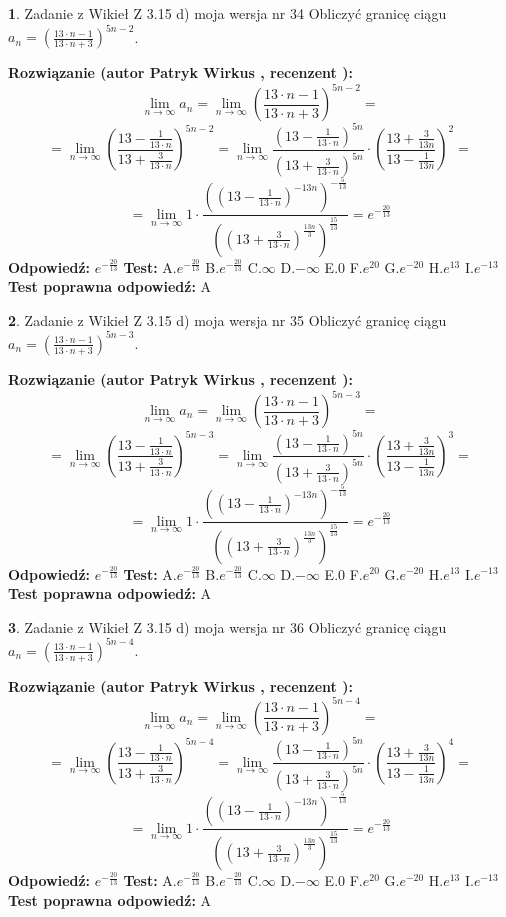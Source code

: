 \documentclass[12pt, a4paper]{article}
\theoremstyle{definition} %
\newtheorem{zad}{}
\newcommand{\zadStart}[1]{\begin{zad}#1\newline}
\newcommand{\zadStop}{\end{zad}}
\newcommand{\rozwStart}[2]{\noindent \textbf{Rozwiązanie (autor #1 , recenzent #2): }\newline}
\newcommand{\rozwStop}{\newline}
\newcommand{\odpStart}{\noindent \textbf{Odpowiedź:}\newline}
\newcommand{\odpStop}{\newline}
\newcommand{\testStart}{\noindent \textbf{Test:}\newline}
\newcommand{\testStop}{\newline}
\newcommand{\kluczStart}{\noindent \textbf{Test poprawna odpowiedź:}\newline}
\newcommand{\kluczStop}{\newline}
\begin{document}
\zadStart{Zadanie z Wikieł Z 3.15 d) moja wersja nr 34}
Obliczyć granicę ciągu $a_{n}=(\frac{13\cdot n - 1}{13 \cdot n + 3})^{5n-2}$.
\zadStop
\rozwStart{Patryk Wirkus}{}
$$\lim\limits_{n\to\infty} a_{n} = \lim\limits_{n\to\infty}(\frac{13\cdot n - 1}{13 \cdot n + 3})^{5n-2}=$$
$$=\lim\limits_{n\to\infty}(\frac{13 - \frac{1}{13\cdot n}}{13 + \frac{3}{13 \cdot n}})^{5n-2}=\lim\limits_{n\to\infty}\frac{(13 - \frac{1}{13\cdot n})^{5n}}{(13 + \frac{3}{13\cdot n})^{5n}} \cdot (\frac{13+\frac{3}{13n}}{13-\frac{1}{13n}})^{2}=$$
$$=\lim\limits_{n\to\infty} 1 \cdot \frac{((13-\frac{1}{13 \cdot n})^{-13n})^{-\frac{5}{13}}}{((13+\frac{3}{13 \cdot n})^{\frac{13n}{3}})^{\frac{15}{13}}} =e^{-\frac{20}{13}}$$
\rozwStop
\odpStart
$e^{-\frac{20}{13}}$
\odpStop
\testStart
A.$ e^{-\frac{20}{13}}$
B.$ e^{-\frac{20}{13}}$
C.$\infty$
D.$-\infty$
E.$0$
F.$e^{20}$
G.$e^{-20}$
H.$e^{13}$
I.$e^{-13}$
\testStop
\kluczStart
A
\kluczStop



\zadStart{Zadanie z Wikieł Z 3.15 d) moja wersja nr 35}
Obliczyć granicę ciągu $a_{n}=(\frac{13\cdot n - 1}{13 \cdot n + 3})^{5n-3}$.
\zadStop
\rozwStart{Patryk Wirkus}{}
$$\lim\limits_{n\to\infty} a_{n} = \lim\limits_{n\to\infty}(\frac{13\cdot n - 1}{13 \cdot n + 3})^{5n-3}=$$
$$=\lim\limits_{n\to\infty}(\frac{13 - \frac{1}{13\cdot n}}{13 + \frac{3}{13 \cdot n}})^{5n-3}=\lim\limits_{n\to\infty}\frac{(13 - \frac{1}{13\cdot n})^{5n}}{(13 + \frac{3}{13\cdot n})^{5n}} \cdot (\frac{13+\frac{3}{13n}}{13-\frac{1}{13n}})^{3}=$$
$$=\lim\limits_{n\to\infty} 1 \cdot \frac{((13-\frac{1}{13 \cdot n})^{-13n})^{-\frac{5}{13}}}{((13+\frac{3}{13 \cdot n})^{\frac{13n}{3}})^{\frac{15}{13}}} =e^{-\frac{20}{13}}$$
\rozwStop
\odpStart
$e^{-\frac{20}{13}}$
\odpStop
\testStart
A.$ e^{-\frac{20}{13}}$
B.$ e^{-\frac{20}{13}}$
C.$\infty$
D.$-\infty$
E.$0$
F.$e^{20}$
G.$e^{-20}$
H.$e^{13}$
I.$e^{-13}$
\testStop
\kluczStart
A
\kluczStop



\zadStart{Zadanie z Wikieł Z 3.15 d) moja wersja nr 36}
Obliczyć granicę ciągu $a_{n}=(\frac{13\cdot n - 1}{13 \cdot n + 3})^{5n-4}$.
\zadStop
\rozwStart{Patryk Wirkus}{}
$$\lim\limits_{n\to\infty} a_{n} = \lim\limits_{n\to\infty}(\frac{13\cdot n - 1}{13 \cdot n + 3})^{5n-4}=$$
$$=\lim\limits_{n\to\infty}(\frac{13 - \frac{1}{13\cdot n}}{13 + \frac{3}{13 \cdot n}})^{5n-4}=\lim\limits_{n\to\infty}\frac{(13 - \frac{1}{13\cdot n})^{5n}}{(13 + \frac{3}{13\cdot n})^{5n}} \cdot (\frac{13+\frac{3}{13n}}{13-\frac{1}{13n}})^{4}=$$
$$=\lim\limits_{n\to\infty} 1 \cdot \frac{((13-\frac{1}{13 \cdot n})^{-13n})^{-\frac{5}{13}}}{((13+\frac{3}{13 \cdot n})^{\frac{13n}{3}})^{\frac{15}{13}}} =e^{-\frac{20}{13}}$$
\rozwStop
\odpStart
$e^{-\frac{20}{13}}$
\odpStop
\testStart
A.$ e^{-\frac{20}{13}}$
B.$ e^{-\frac{20}{13}}$
C.$\infty$
D.$-\infty$
E.$0$
F.$e^{20}$
G.$e^{-20}$
H.$e^{13}$
I.$e^{-13}$
\testStop
\kluczStart
A
\kluczStop
\end{document}
